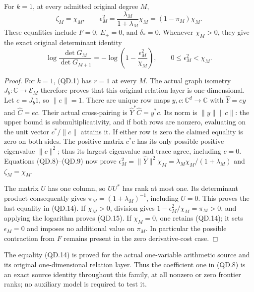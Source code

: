 \begin{theorem}
For \(k=1\), at every admitted original degree \(M\),
\[
 \boxed{\zeta_M=\chi_M,\qquad
 \epsilon_M^2=\frac{\lambda_M}{1+\lambda_M}\chi_M
                    =(1-\pi_M)\chi_M.}                    \tag{QD.14}
\]
These equalities include \(F=0\), \(E_+=0\), and
\(\delta_*=0\).  Whenever \(\chi_M>0\), they give the
exact original determinant identity
\[
 \boxed{\log\frac{\det G_M}{\det G_{M+1}}
     =-\log\left(1-\frac{\epsilon_M^2}{\chi_M}\right),
 \qquad 0\leq\epsilon_M^2<\chi_M.}                        \tag{QD.15}
\]
\end{theorem}
\begin{proof}
For \(k=1\), (QD.1) has \(r=1\) at every \(M\).
The actual graph isometry \(J_b:\mathbb C\to\mathcal E_M\)
therefore proves that this original relation layer is
one-dimensional.  Let \(e=J_b1\), so \(\|e\|=1\).
There are unique row maps \(y,c:\mathbb C^d\to\mathbb C\)
with \(\widehat Y=e y\) and \(\widehat C=e c\).
Their actual cross-pairing is \(\widehat Y^*\widehat C=y^*c\).
Its norm is \(\|y\|\|c\|\): the upper bound is
submultiplicativity, and if both rows are nonzero, evaluating
on the unit vector \(c^*/\|c\|\) attains it.  If either
row is zero the claimed equality is zero on both sides.
The positive matrix \(c^*c\) has its only possible
positive eigenvalue \(\|c\|^2\); thus its largest
eigenvalue and trace agree, including \(c=0\).
Equations (QD.8)--(QD.9) now prove
\(\epsilon_M^2=\|\widehat Y\|^2\chi_M
=\lambda_M\chi_M/(1+\lambda_M)\) and \(\zeta_M=\chi_M\).

The matrix \(U\) has one column, so \(UU^*\) has rank
at most one.  Its determinant product consequently gives
\(\pi_M=(1+\lambda_M)^{-1}\), including \(U=0\).
This proves the last equality in (QD.14).  If \(\chi_M>0\),
division gives \(1-\epsilon_M^2/\chi_M=\pi_M>0\),
and applying the logarithm proves (QD.15).
If \(\chi_M=0\), one retains (QD.14); it sets
\(\epsilon_M=0\) and imposes no additional value on
\(\pi_M\).  In particular the possible contraction from
\(F\) remains present in the zero derivative-cost case.
\end{proof}

The equality (QD.14) is proved for the actual one-variable
arithmetic source and its original one-dimensional relation
layer.  Thus the coefficient one in (QD.8) is an exact
source identity throughout this family, at all nonzero or
zero frontier ranks; no auxiliary model is required to test it.
